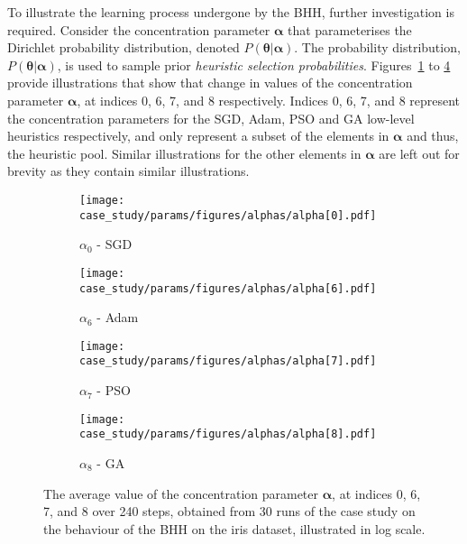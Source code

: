 To illustrate the learning process undergone by the \acs{BHH}, further investigation is required. Consider the concentration parameter $\boldsymbol{\alpha}$ that parameterises the Dirichlet probability distribution, denoted $P(\boldsymbol{\theta} \vert \boldsymbol{\alpha})$. The probability distribution, $P(\boldsymbol{\theta} \vert \boldsymbol{\alpha})$, is used to sample prior \textit{heuristic selection probabilities}. Figures~\ref{fig:results:case_study:alphas:0} to \ref{fig:results:case_study:alphas:8} provide illustrations that show that change in values of the concentration parameter $\boldsymbol{\alpha}$, at indices 0, 6, 7, and 8 respectively. Indices 0, 6, 7, and 8 represent the concentration parameters for the \acs{SGD}, \acs{Adam}, \acs{PSO} and \acs{GA} low-level heuristics respectively, and only represent a subset of the elements in $\boldsymbol{\alpha}$ and thus, the heuristic pool. Similar illustrations for the other elements in $\boldsymbol{\alpha}$ are left out for brevity as they contain similar illustrations.

\begin{figure}[htb]
      \begin{subfigure}{0.5\textwidth}
            \centering
            \texttt{[image: case\_study/params/figures/alphas/alpha[0].pdf]}
            \caption{$\alpha_{0}$ - \acs{SGD}}
            \label{fig:results:case_study:alphas:0}
      \end{subfigure}
      \begin{subfigure}{0.5\textwidth}
            \centering
            \texttt{[image: case\_study/params/figures/alphas/alpha[6].pdf]}
            \caption{$\alpha_{6}$ - \acs{Adam}}
            \label{fig:results:case_study:alphas:6}
      \end{subfigure}
      \par\bigskip
      \begin{subfigure}{0.5\textwidth}
            \centering
            \texttt{[image: case\_study/params/figures/alphas/alpha[7].pdf]}
            \caption{$\alpha_{7}$ - \acs{PSO}}
            \label{fig:results:case_study:alphas:7}
      \end{subfigure}
      \begin{subfigure}{0.5\textwidth}
            \centering
            \texttt{[image: case\_study/params/figures/alphas/alpha[8].pdf]}
            \caption{$\alpha_{8}$ - \acs{GA}}
            \label{fig:results:case_study:alphas:8}
      \end{subfigure}
      \par\bigskip
      \caption{The average value of the concentration parameter $\boldsymbol{\alpha}$, at indices 0, 6, 7, and 8 over 240 steps, obtained from 30 runs of the case study on the behaviour of the \acs{BHH} on the iris dataset, illustrated in log scale.}
      \label{fig:results:case_study:alphas}
\end{figure}

